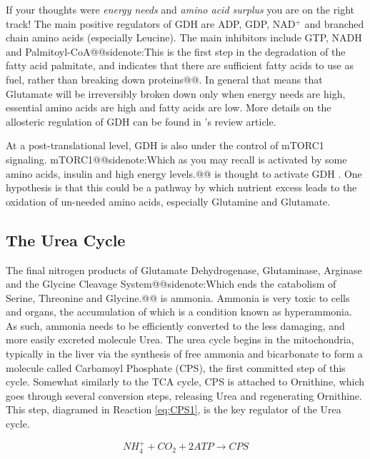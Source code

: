 \documentclass{tufte-handout}
\makeatletter
\def\sidenote#1{@@sidenote:#1@@}
\makeatother
\begin{document}
If your thoughts were \emph{energy needs} and \emph{amino acid surplus} you are on the right track!  The main positive regulators of GDH are ADP, GDP, NAD$^+$ and branched chain amino acids (especially Leucine).  The main inhibitors include GTP, NADH and Palmitoyl-CoA\sidenote{This is the first step in the degradation of the fatty acid palmitate, and indicates that there are sufficient fatty acids to use as fuel, rather than breaking down proteins}.  In general that means that Glutamate will be irreversibly broken down only when energy needs are high, essential amino acids are high and fatty acids are low.  More details on the allosteric regulation of GDH can be found in \citet{Smith2008}'s review article.  

At a post-translational level, GDH is also under the control of mTORC1 signaling.  mTORC1\sidenote{Which as you may recall is activated by some amino acids, insulin and high energy levels.} is thought to activate GDH \citep{Csibi2013}.  One hypothesis is that this could be a pathway by which nutrient excess leads to the oxidation of un-needed amino acids, especially Glutamine and Glutamate.

\subsection{The Urea Cycle}

The final nitrogen products of Glutamate Dehydrogenase, Glutaminase, Arginase and the Glycine Cleavage System\sidenote{Which ends the catabolism of Serine, Threonine and Glycine.} is ammonia.  Ammonia is very toxic to cells and organs, the accumulation of which is a condition known as hyperammonia.  As such, ammonia needs to be efficiently converted to the less damaging, and more easily excreted molecule Urea.  The urea cycle begins in the mitochondria, typically in the liver via the synthesis of free ammonia and bicarbonate to form a molecule called Carbamoyl Phosphate (CPS), the first committed step of this cycle.  Somewhat similarly to the TCA cycle, CPS is attached to Ornithine, which goes through several conversion steps, releasing Urea and regenerating Ornithine.  This step, diagramed in Reaction \ref{eq:CPS1}, is the key regulator of the Urea cycle.

\begin{equation}\label{eq:CPS1}
 NH_4^+ + CO_2 + 2 ATP \rightarrow  CPS
\end{equation}
\end{document}
